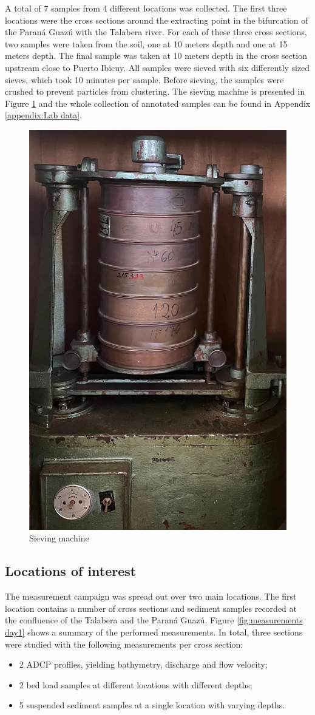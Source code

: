 A total of 7 samples from 4 different locations was collected. The first three locations were the cross sections around the extracting point in the bifurcation of the Paraná Guazú with the Talabera river. For each of these three cross sections, two samples were taken from the soil, one at 10 meters depth and one at 15 meters depth. The final sample was taken at 10 meters depth in the cross section upstream close to Puerto Ibicuy. All samples were sieved with six differently sized sieves, which took 10 minutes per sample. Before sieving, the samples were crushed to prevent particles from clustering. The sieving machine is presented in Figure \ref{fig:siev} and the whole collection of annotated samples can be found in Appendix \ref{appendix:Lab data}.

\begin{figure}[H]
    \centering
    \includegraphics[width=0.35\linewidth]{figures//ch3/siev.jpeg}
    \caption{Sieving machine}
    \label{fig:siev}
\end{figure}

\subsection{Locations of interest}
The measurement campaign was spread out over two main locations. The first location contains a number of cross sections and sediment samples recorded at the confluence of the Talabera and the Paraná Guazú. Figure \ref{fig:measurements day1} shows a summary of the performed measurements. In total, three sections were studied with the following measurements per cross section:
\begin{itemize}
    \item 2 ADCP profiles, yielding bathymetry, discharge and flow velocity;
    \item 2 bed load samples at different locations with different depths;
    \item 5 suspended sediment samples at a single location with varying depths.
\end{itemize}

